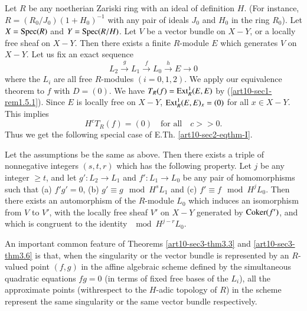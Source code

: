 \begin{romanexam}\label{art10-sec3-exam-II}
Let $R$ be any noetherian Zariski ring with an ideal of definition $H$. (For instance, $R=(R_{0}/J_{0})(1+H_{0})^{-1}$ with any pair of ideals $J_{0}$ and $H_{0}$ in the ring $R_{0}$). Let $X=\operatorname{\mathrm{Spec}} (R)$ and $Y=\operatorname{\mathrm{Spec}} (R/H)$. Let $V$ be a vector bundle on $X-Y$, or a locally free sheaf on $X-Y$. Then there exists a finite $R$-module $E$ which generates $V$ on $X-Y$. Let us fix an exact sequence
\begin{equation}
L_{2}\xrightarrow{g}L_{1}\xrightarrow{f}L_{0}\xrightarrow{h}E\to 0\label{art10-sec3-eq3.4}
\end{equation}
where the $L_{i}$ are all free $R$-modules $(i=0,1,2)$. We apply our equivalence theorem to $f$ with $D=(0)$. We have $T_{R}(f)=\operatorname{\mathrm{Ext}}^{1}_{R}(E,E)$ by (\ref{art10-sec1-rem1.5.1}). Since $E$ is locally free on $X-Y$, $\operatorname{\mathrm{Ext}}^{1}_{R}(E,E)_{x}=(0)$ for all $x\in X-Y$. This implies
\begin{equation}
H^{c}T_{R}(f)=(0)\text{~~ for all~~ } c>>0.\label{art10-sec3-eq3.5}
\end{equation}
Thus we get the following special case of E.Th. \ref{art10-sec2-eqthm-I}.
\end{romanexam}

\setcounter{theorem}{5}
\begin{theorem}\label{art10-sec3-thm3.6}
Let the assumptions be the same as above. Then there exists a triple of nonnegative integers $(s,t,r)$ which has the following property. Let $j$ be any integer $\geq t$, and let $g':L_{2}\to L_{1}$ and $f':L_{1}\to L_{0}$ be any pair of homomorphisms such that {\rm(a)} $f'g'=0$, {\rm(b)} $g'\equiv g\mod H^{s}L_{1}$ and {\rm(c)} $f'\equiv f\mod H^{j}L_{0}$. Then there exists an automorphism of the $R$-module $L_{0}$ which induces an isomorphism from $V$ to $V'$, with the locally free sheaf $V'$ on $X-Y$ generated by $\operatorname{\mathrm{Coker}} (f')$, and which is congruent to the identity $\mod H^{j-r}L_{0}$.
\end{theorem}

\begin{remark}\label{art10-sec3-rem3.7}
An important common feature of Theorems \ref{art10-sec3-thm3.3} and \ref{art10-sec3-thm3.6} is that, when the singularity or the vector bundle is represented by an $R$-valued point $(f,g)$ in the affine algebraic scheme defined by the simultaneous quadratic equations $fg=0$ (in terms of fixed free bases of the $L_{i}$), all the approximate points (with\pageoriginale respect to the $H$-adic topology of $R$) in the scheme represent the same singularity or the same vector bundle respectively.
\end{remark}

